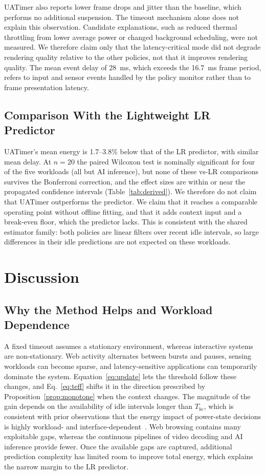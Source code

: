 \documentclass[journal]{IEEEtran}
\begin{document}
UATimer also reports lower frame drops and jitter than the baseline, which performs no additional suspension. The timeout mechanism alone does not explain this observation. Candidate explanations, such as reduced thermal throttling from lower average power or changed background scheduling, were not measured. We therefore claim only that the latency-critical mode did not degrade rendering quality relative to the other policies, not that it improves rendering quality. The mean event delay of 28~ms, which exceeds the 16.7~ms frame period, refers to input and sensor events handled by the policy monitor rather than to frame presentation latency.

\subsection{Comparison With the Lightweight LR Predictor}
UATimer's mean energy is 1.7--3.8\% below that of the LR predictor, with similar mean delay. At $n=20$ the paired Wilcoxon test is nominally significant for four of the five workloads (all but AI inference), but none of these vs-LR comparisons survives the Bonferroni correction, and the effect sizes are within or near the propagated confidence intervals (Table~\ref{tab:derived}). We therefore do not claim that UATimer outperforms the predictor. We claim that it reaches a comparable operating point without offline fitting, and that it adds context input and a break-even floor, which the predictor lacks. This is consistent with the shared estimator family: both policies are linear filters over recent idle intervals, so large differences in their idle predictions are not expected on these workloads.

\section{Discussion}
\subsection{Why the Method Helps and Workload Dependence}
A fixed timeout assumes a stationary environment, whereas interactive systems are non-stationary. Web activity alternates between bursts and pauses, sensing workloads can become sparse, and latency-sensitive applications can temporarily dominate the system. Equation~\eqref{eq:update} lets the threshold follow these changes, and Eq.~\eqref{eq:teff} shifts it in the direction prescribed by Proposition~\ref{prop:monotone} when the context changes. The magnitude of the gain depends on the availability of idle intervals longer than $T_{be}$, which is consistent with prior observations that the energy impact of power-state decisions is highly workload- and interface-dependent~\cite{carroll2010power,michelinakis2021nbiot}. Web browsing contains many exploitable gaps, whereas the continuous pipelines of video decoding and AI inference provide fewer. Once the available gaps are captured, additional prediction complexity has limited room to improve total energy, which explains the narrow margin to the LR predictor.
\end{document}
